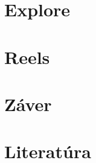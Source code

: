 \documentclass[10pt,twoside,slovak,a4paper]{article}
\begin{document}
\section{Explore} \label{dolezita}




\section{Reels} \label{dolezitejsia}



\section{Záver} \label{zaver} %
\section{Literatúra} 





\end{document}
